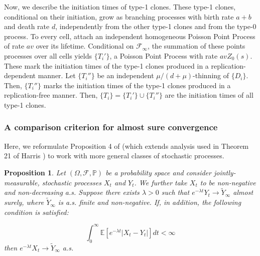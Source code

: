 \documentclass{article}
\numberwithin{equation}{section}
\newtheorem{proposition}{Proposition}
\begin{document}
Now, we describe the initiation times of type-1 clones. These type-1 clones, conditional on their initiation, grow as branching processes with birth rate $a+b$ and death rate $d$, independently from the other type-1 clones and from the type-0 process. To every cell, attach an independent homogeneous Poisson Point Process of rate $av$ over its lifetime. Conditional on $\mathcal{F}_\infty$, the summation of these points processes over all cells yields $\{T_i'\}$, a Poisson Point Process with rate $av Z_0(s)$. These mark the initiation times of the type-1 clones produced in a replication-dependent manner. Let $\{T_i''\}$ be an independent $\mu/(d+\mu)$-thinning of $\{D_i\}$. Then, $\{T_i''\}$ marks the initiation times of the type-1 clones produced in a replication-free manner. Then, $\{T_i\}=\{T_i'\}\cup \{T_i''\}$ are the initiation times of all type-1 clones.


\subsubsection{A comparison criterion for almost sure convergence}

Here, we reformulate Proposition 4 of \cite{gunnarsson2025} (which extends analysis used in Theorem 21 of Harris \cite{harris1963}) to work with more general classes of stochastic processes.

\begin{proposition}
  Let $(\Omega,\mathcal{F},\mathbb{P})$ be a probability space and consider jointly-measurable, stochastic processes $X_t$ and $Y_t$. We further take $X_t$ to be non-negative and non-decreasing a.s. Suppose there exists $\lambda>0$ such that $e^{-\lambda t}Y_t \to \widetilde{Y}_\infty$ almost surely, where $\widetilde{Y}_\infty$ is a.s. finite and non-negative. If, in addition, the following condition is satisfied:

  \[\int_0^\infty \mathbb{E}[e^{-\lambda t}|X_t-Y_t|]dt<\infty\]
then $e^{-\lambda t}X_t\to \widetilde{Y}_\infty$ a.s.\label{prop:convergence_tool}
\end{proposition}
\end{document}
